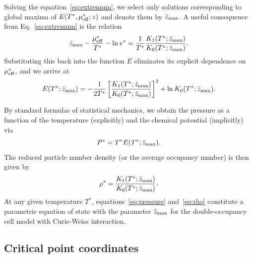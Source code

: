 \documentclass[pdflatex,sn-mathphys-num]{sn-jnl}%
\theoremstyle{thmstyleone}%
\theoremstyle{thmstyletwo}%
\theoremstyle{thmstylethree}%
\begin{document}
	Solving the equation~\eqref{eq:extremum}, we select only solutions corresponding to global maxima of $E(T^*, \mu^*_{\rm eff}; z)$ and denote them by $\bar{z}_{\rm max}$. A useful consequence from Eq.~\eqref{eq:extremum} is the relation
	\begin{equation}
		\label{eq:extremum_z}
		\bar{z}_{\rm max} - \frac{\mu^*_{\rm eff}}{T^*} - \ln v^* = \frac{1}{T^*} \frac{K_1(T^*; \bar{z}_{\rm max})}{K_0(T^*; \bar{z}_{\rm max})}.
	\end{equation}
	Substituting this back into the function $E$ eliminates its explicit dependence on $\mu^*_{\rm eff}$, and we arrive at
	\begin{equation}\label{Esimplified}
		E(T^*; \bar{z}_{\rm max}) = -\frac{1}{2T^*} \left[\frac{K_1(T^*; \bar{z}_{\rm max})}{K_0(T^*; \bar{z}_{\rm max})}\right]^2 + \ln K_0(T^*;\bar{z}_{\rm max}).
	\end{equation}
	
	By standard formulas of statistical mechanics, we obtain the pressure as a function of the temperature (explicitly) and the chemical potential (implicitly) via
	\begin{equation}
		\label{eq:pressure}
		P^* = T^* E(T^*; \bar{z}_{\rm max}).
	\end{equation}
	The reduced particle number density (or the average occupancy number) is then given by
	\begin{equation}
		\label{eq:rho}
		\rho^* = \frac{K_1(T^*; \bar{z}_{\rm max})}{K_0(T^*; \bar{z}_{\rm max})}.
	\end{equation}
	At any given temperature $T^*$, equations~\eqref{eq:pressure} and~\eqref{eq:rho} constitute a parametric equation of state with the parameter $\bar{z}_{\rm max}$ for the double-occupancy cell model with Curie-Weiss interaction.
	
	\subsection{Critical point coordinates}
	\label{sec:cp}
	
\end{document}
